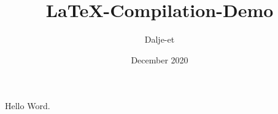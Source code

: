 \documentclass{article}
\title{LaTeX-Compilation-Demo}
\author{Dalje-et}
\date{December 2020}
\begin{document}
\maketitle

Hello Word.
\end{document}

